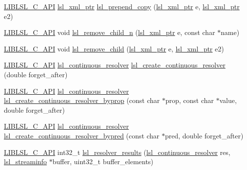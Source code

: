 \begin{DoxyCompactItemize}
\item 
\hyperlink{lsl__cpp_8h_aafd0ef1813e8be84a1420c4f1df64615}{L\+I\+B\+L\+S\+L\+\_\+\+C\+\_\+\+A\+PI} \hyperlink{namespacelsl_a5edc7a49a1a1be1634fe6dce3d59c59b}{lsl\+\_\+xml\+\_\+ptr} \hyperlink{namespacelsl_a6f0ee82a8282d19f01ddb2654f367e6c}{lsl\+\_\+prepend\+\_\+copy} (\hyperlink{namespacelsl_a5edc7a49a1a1be1634fe6dce3d59c59b}{lsl\+\_\+xml\+\_\+ptr} e, \hyperlink{namespacelsl_a5edc7a49a1a1be1634fe6dce3d59c59b}{lsl\+\_\+xml\+\_\+ptr} e2)
\item 
\hyperlink{lsl__cpp_8h_aafd0ef1813e8be84a1420c4f1df64615}{L\+I\+B\+L\+S\+L\+\_\+\+C\+\_\+\+A\+PI} void \hyperlink{namespacelsl_a1a946a99964cbd500165fbd5f3d33766}{lsl\+\_\+remove\+\_\+child\+\_\+n} (\hyperlink{namespacelsl_a5edc7a49a1a1be1634fe6dce3d59c59b}{lsl\+\_\+xml\+\_\+ptr} e, const char $\ast$name)
\item 
\hyperlink{lsl__cpp_8h_aafd0ef1813e8be84a1420c4f1df64615}{L\+I\+B\+L\+S\+L\+\_\+\+C\+\_\+\+A\+PI} void \hyperlink{namespacelsl_ad367e1e282a1fa614f44caaf113cf39c}{lsl\+\_\+remove\+\_\+child} (\hyperlink{namespacelsl_a5edc7a49a1a1be1634fe6dce3d59c59b}{lsl\+\_\+xml\+\_\+ptr} e, \hyperlink{namespacelsl_a5edc7a49a1a1be1634fe6dce3d59c59b}{lsl\+\_\+xml\+\_\+ptr} e2)
\item 
\hyperlink{lsl__cpp_8h_aafd0ef1813e8be84a1420c4f1df64615}{L\+I\+B\+L\+S\+L\+\_\+\+C\+\_\+\+A\+PI} \hyperlink{namespacelsl_ab09ea0488f986f056322c3c866dc0a0f}{lsl\+\_\+continuous\+\_\+resolver} \hyperlink{namespacelsl_a8da66ce60f1720e808771e14337e4bdb}{lsl\+\_\+create\+\_\+continuous\+\_\+resolver} (double forget\+\_\+after)
\item 
\hyperlink{lsl__cpp_8h_aafd0ef1813e8be84a1420c4f1df64615}{L\+I\+B\+L\+S\+L\+\_\+\+C\+\_\+\+A\+PI} \hyperlink{namespacelsl_ab09ea0488f986f056322c3c866dc0a0f}{lsl\+\_\+continuous\+\_\+resolver} \hyperlink{namespacelsl_a673d636b9a52467485a9ff6114bcafd6}{lsl\+\_\+create\+\_\+continuous\+\_\+resolver\+\_\+byprop} (const char $\ast$prop, const char $\ast$value, double forget\+\_\+after)
\item 
\hyperlink{lsl__cpp_8h_aafd0ef1813e8be84a1420c4f1df64615}{L\+I\+B\+L\+S\+L\+\_\+\+C\+\_\+\+A\+PI} \hyperlink{namespacelsl_ab09ea0488f986f056322c3c866dc0a0f}{lsl\+\_\+continuous\+\_\+resolver} \hyperlink{namespacelsl_a632a18d8a150be1ae72efac7074c476d}{lsl\+\_\+create\+\_\+continuous\+\_\+resolver\+\_\+bypred} (const char $\ast$pred, double forget\+\_\+after)
\item 
\hyperlink{lsl__cpp_8h_aafd0ef1813e8be84a1420c4f1df64615}{L\+I\+B\+L\+S\+L\+\_\+\+C\+\_\+\+A\+PI} int32\+\_\+t \hyperlink{namespacelsl_ab8f71fa0b8c09cb21a78aa86d03ad8fc}{lsl\+\_\+resolver\+\_\+results} (\hyperlink{namespacelsl_ab09ea0488f986f056322c3c866dc0a0f}{lsl\+\_\+continuous\+\_\+resolver} res, \hyperlink{namespacelsl_aa0a9ce9956061679949daa2e35aae2e8}{lsl\+\_\+streaminfo} $\ast$buffer, uint32\+\_\+t buffer\+\_\+elements)

\end{DoxyCompactItemize}
